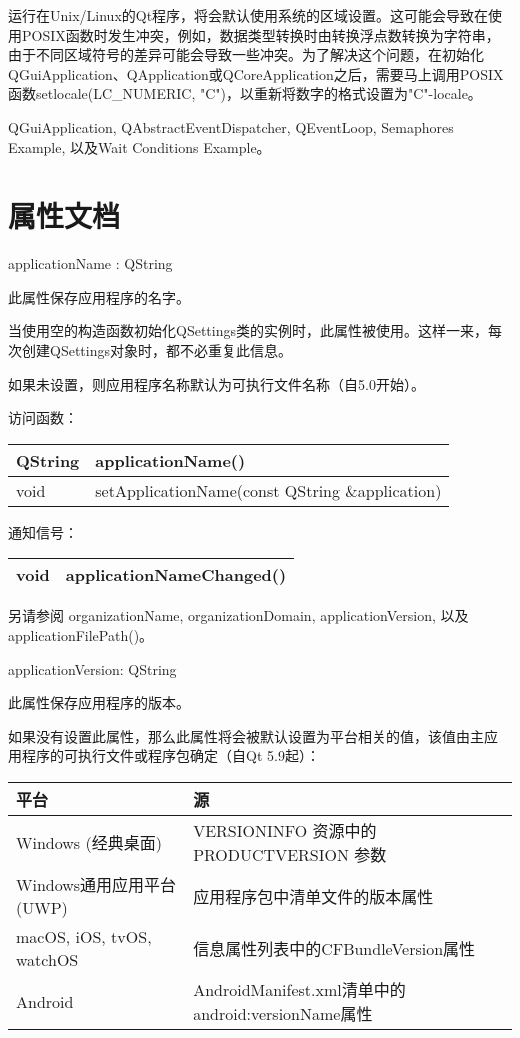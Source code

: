 运行在Unix/Linux的Qt程序，将会默认使用系统的区域设置。这可能会导致在使用POSIX函数时发生冲突，例如，数据类型转换时由转换浮点数转换为字符串，由于不同区域符号的差异可能会导致一些冲突。为了解决这个问题，在初始化QGuiApplication、QApplication或QCoreApplication之后，需要马上调用POSIX函数setlocale(LC\_NUMERIC, "C")，以重新将数字的格式设置为"C"-locale。

\begin{seeAlso}
QGuiApplication, QAbstractEventDispatcher, QEventLoop, Semaphores Example, 以及Wait Conditions Example。
\end{seeAlso}

\splitLine

\section{属性文档}

applicationName : QString

此属性保存应用程序的名字。

当使用空的构造函数初始化QSettings类的实例时，此属性被使用。这样一来，每次创建QSettings对象时，都不必重复此信息。

如果未设置，则应用程序名称默认为可执行文件名称（自5.0开始）。

访问函数：

\begin{tabular}{|l|l|}
\hline
QString	&applicationName()\\
\hline
void	&setApplicationName(const QString \&application)\\
\hline
\end{tabular}

通知信号：

\begin{tabular}{|l|l|}
\hline
void	&applicationNameChanged()\\
\hline
\end{tabular}

另请参阅 organizationName, organizationDomain, applicationVersion, 以及 applicationFilePath()。

applicationVersion: QString

此属性保存应用程序的版本。

如果没有设置此属性，那么此属性将会被默认设置为平台相关的值，该值由主应
用程序的可执行文件或程序包确定（自Qt 5.9起）：

\begin{tabular}{|l|l|}
\hline
平台	&源\\
\hline
Windows (经典桌面)&	VERSIONINFO 资源中的 PRODUCTVERSION 参数\\
\hline
Windows通用应用平台(UWP)&	应用程序包中清单文件的版本属性\\
\hline
macOS, iOS, tvOS, watchOS&	信息属性列表中的CFBundleVersion属性\\
\hline
Android	&AndroidManifest.xml清单中的android:versionName属性\\
\hline
\end{tabular}

